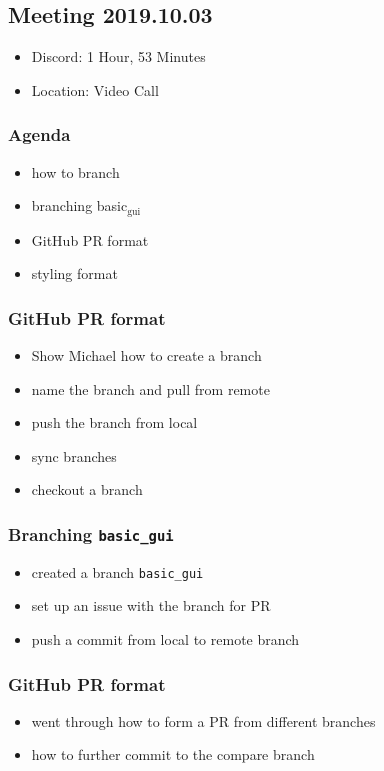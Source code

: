 \documentclass[11pt]{article}
\begin{document}
\subsection{Meeting 2019.10.03}
\label{sec:orgea980d4}
\begin{itemize}
\item Discord: 1 Hour, 53 Minutes
\item Location: Video Call
\end{itemize}
\subsubsection*{Agenda}
\label{sec:org31830e2}
\begin{itemize}
\item how to branch
\item branching basic\(_{\text{gui}}\)
\item GitHub PR format
\item styling format
\end{itemize}
\subsubsection*{GitHub PR format}
\label{sec:org7eee53c}
\begin{itemize}
\item Show Michael how to create a branch
\item name the branch and pull from remote
\item push the branch from local
\item sync branches
\item checkout a branch
\end{itemize}
\subsubsection*{Branching \texttt{basic\_gui}}
\label{sec:org6ffebe3}
\begin{itemize}
\item created a branch \texttt{basic\_gui}
\item set up an issue with the branch for PR
\item push a commit from local to remote branch
\end{itemize}
\subsubsection*{GitHub PR format}
\label{sec:orgd4111f4}
\begin{itemize}
\item went through how to form a PR from different branches
\item how to further commit to the compare branch
\end{itemize}
\end{document}
